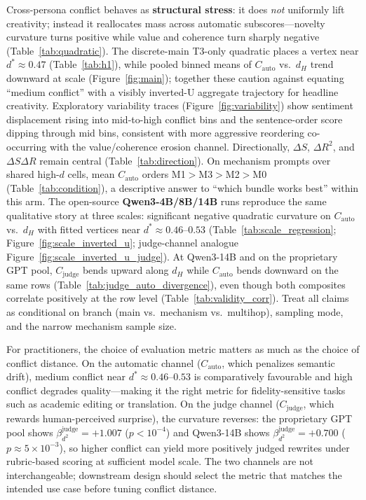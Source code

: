 \documentclass[sigconf,nonacm]{acmart}
\begin{document}
Cross-persona conflict behaves as \textbf{structural stress}: it does \emph{not} uniformly lift creativity; instead it reallocates mass across automatic subscores---novelty curvature turns positive while value and coherence turn sharply negative (Table~\ref{tab:quadratic}). The discrete-main T3-only quadratic places a vertex near $d^\ast{\approx}0.47$ (Table~\ref{tab:h1}), while pooled binned means of $C_{\mathrm{auto}}$ vs.\ $d_H$ trend downward at scale (Figure~\ref{fig:main}); together these caution against equating ``medium conflict'' with a visibly inverted-U aggregate trajectory for headline creativity.
Exploratory variability traces (Figure~\ref{fig:variability}) show sentiment displacement rising into mid-to-high conflict bins and the sentence-order score dipping through mid bins, consistent with more aggressive reordering co-occurring with the value/coherence erosion channel.
Directionally, $\Delta S$, $\Delta R^2$, and $\Delta S\Delta R$ remain central (Table~\ref{tab:direction}). On mechanism prompts over shared high-$d$ cells, mean $C_{\mathrm{auto}}$ orders M1${>}$M3${>}$M2${>}$M0 (Table~\ref{tab:condition}), a descriptive answer to ``which bundle works best'' within this arm.
The open-source \textbf{Qwen3-4B/8B/14B} runs reproduce the same qualitative story at three scales: significant negative quadratic curvature on $C_{\mathrm{auto}}$ vs.\ $d_H$ with fitted vertices near $d^\ast{\approx}0.46$--$0.53$ (Table~\ref{tab:scale_regression}; Figure~\ref{fig:scale_inverted_u}; judge-channel analogue Figure~\ref{fig:scale_inverted_u_judge}).
At Qwen3-14B and on the proprietary GPT pool, $C_{\mathrm{judge}}$ bends upward along $d_H$ while $C_{\mathrm{auto}}$ bends downward on the same rows (Table~\ref{tab:judge_auto_divergence}), even though both composites correlate positively at the row level (Table~\ref{tab:validity_corr}).
Treat all claims as conditional on branch (main vs.\ mechanism vs.\ multihop), sampling mode, and the narrow mechanism sample size.

For practitioners, the choice of evaluation metric matters as much as the choice of conflict distance. On the automatic channel ($C_{\mathrm{auto}}$, which penalizes semantic drift), medium conflict near $d^\ast{\approx}0.46$--$0.53$ is comparatively favourable and high conflict degrades quality---making it the right metric for fidelity-sensitive tasks such as academic editing or translation. On the judge channel ($C_{\mathrm{judge}}$, which rewards human-perceived surprise), the curvature reverses: the proprietary GPT pool shows $\beta_{d^2}^{\mathrm{judge}}{=}{+}1.007$ ($p{<}10^{-4}$) and Qwen3-14B shows $\beta_{d^2}^{\mathrm{judge}}{=}{+}0.700$ ($p{\approx}5{\times}10^{-3}$), so higher conflict can yield more positively judged rewrites under rubric-based scoring at sufficient model scale. The two channels are not interchangeable; downstream design should select the metric that matches the intended use case before tuning conflict distance.
\end{document}
